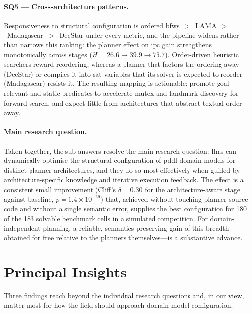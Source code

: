 \paragraph{SQ5 --- Cross-architecture patterns.}
Responsiveness to structural configuration is ordered \gls{bfws}~$>$~LAMA~$>$~Madagascar~$>$~DecStar under every metric, and the pipeline widens rather than narrows this ranking: the planner effect on \gls{ipc} gain strengthens monotonically across stages ($H = 26.6 \rightarrow 39.9 \rightarrow 76.7$).
Order-driven heuristic searchers reward reordering, whereas a planner that factors the ordering away (DecStar) or compiles it into \gls{sat} variables that its solver is expected to reorder (Madagascar) resists it.
The resulting mapping is actionable: promote goal-relevant and static predicates to accelerate mutex and landmark discovery for forward search, and expect little from architectures that abstract textual order away.

\paragraph{Main research question.}
Taken together, the sub-answers resolve the main research question: \glspl{llm} can dynamically optimise the structural configuration of \gls{pddl} domain models for distinct planner architectures, and they do so most effectively when guided by architecture-specific knowledge and iterative execution feedback.
The effect is a consistent small improvement (Cliff's $\delta = 0.30$ for the architecture-aware stage against baseline, $p = 1.4 \times 10^{-29}$) that, achieved without touching planner source code and without a single semantic error, supplies the best configuration for 180 of the 183 solvable benchmark cells in a simulated competition.
For domain-independent planning, a reliable, semantics-preserving gain of this breadth---obtained for free relative to the planners themselves---is a substantive advance.

\section{Principal Insights}
\label{sec:concl:insights}

Three findings reach beyond the individual research questions and, in our view, matter most for how the field should approach domain model configuration.

